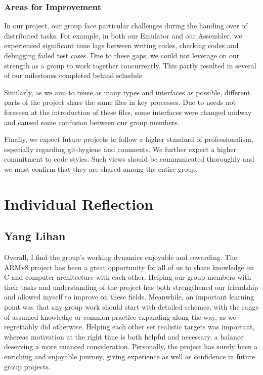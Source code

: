 \documentclass[11pt]{article}
\begin{document}
\subsubsection{Areas for Improvement}

In our project, our group face particular challenges during the handing over of distributed tasks. For example, in both our Emulator and our Assembler, we experienced significant time lags between writing codes, checking codes and debugging failed test cases. Due to these gaps, we could not leverage on our strength as a group to work together concurrently. This partly resulted in several of our milestones completed behind schedule.

Similarly, as we aim to reuse as many types and interfaces as possible, different parts of the project share the same files in key processes. Due to needs not foreseen at the introduction of these files, some interfaces were changed midway and caused some confusion between our group members.

Finally, we expect future projects to follow a higher standard of professionalism, especially regarding git-hygiene and comments. We further expect a higher commitment to code styles. Such views should be communicated thoroughly and we must confirm that they are shared among the entire group.

\section{Individual Reflection}

\subsection{Yang Lihan}

Overall, I find the group's working dynamics enjoyable and rewarding. The ARMv8 project has been a great opportunity for all of us to share knowledge on C and computer architecture with each other. Helping our group members with their tasks and understanding of the project has both strengthened our friendship and allowed myself to improve on these fields. Meanwhile, an important learning point was that any group work should start with detailed schemes, with the range of assumed knowledge or common practice expanding along the way, as we regrettably did otherwise. Helping each other set realistic targets was important, whereas motivation at the right time is both helpful and necessary, a balance deserving a more nuanced consideration. Personally, the project has surely been a enriching and enjoyable journey, giving experience as well as confidence in future group projects.
\end{document}
